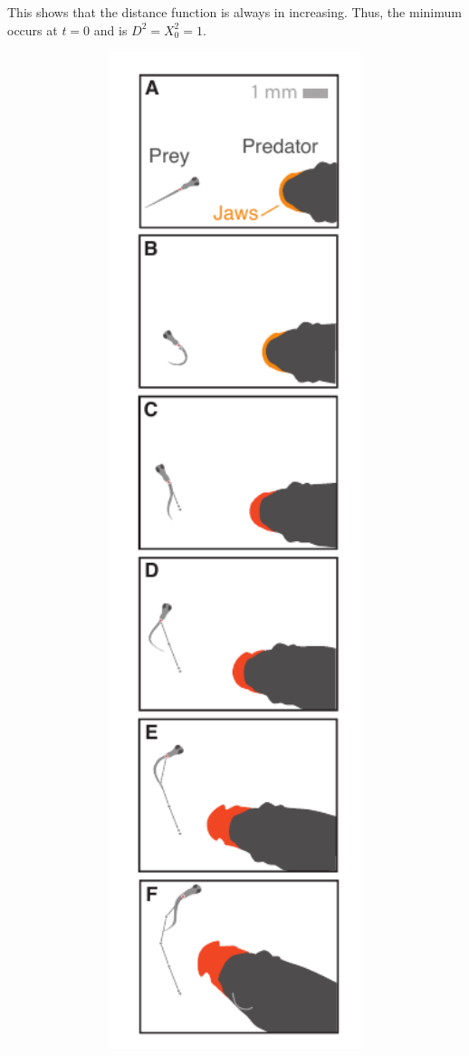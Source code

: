 \documentclass[12pt]{article}
\begin{document}
This shows that the distance function is always in increasing. Thus, the minimum occurs at $t=0$ and is $D^2 = X_0^2 = 1.$







\begin{figure}[t!]
\begin{centering}
\includegraphics[width=1\textwidth]{Fig_01.pdf}

\end{centering}
\end{figure}
\end{document}
